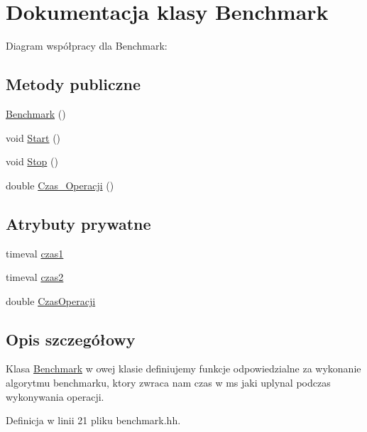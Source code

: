 \hypertarget{class_benchmark}{\section{\-Dokumentacja klasy \-Benchmark}
\label{class_benchmark}
}


\-Diagram współpracy dla \-Benchmark\-:
\subsection*{\-Metody publiczne}
\begin{DoxyCompactItemize}
\item 
\hyperlink{class_benchmark_acfca497989836a688d44477802e822d8}{\-Benchmark} ()
\item 
void \hyperlink{class_benchmark_ac55ca7809108ed22a644d6d41071d187}{\-Start} ()
\item 
void \hyperlink{class_benchmark_aa3ca94f8984beb0ecbfa77d50cbe5c3a}{\-Stop} ()
\item 
double \hyperlink{class_benchmark_aee4890492aa777816da1d63fa7a8c4c2}{\-Czas\-\_\-\-Operacji} ()
\end{DoxyCompactItemize}
\subsection*{\-Atrybuty prywatne}
\begin{DoxyCompactItemize}
\item 
timeval \hyperlink{class_benchmark_a461847eb9a01e511e19af6cd7bcc057e}{czas1}
\item 
timeval \hyperlink{class_benchmark_a56ec92a30b650825403d14907a321eea}{czas2}
\item 
double \hyperlink{class_benchmark_accd4af9649210ce216db513c0676c401}{\-Czas\-Operacji}
\end{DoxyCompactItemize}


\subsection{\-Opis szczegółowy}
\-Klasa \hyperlink{class_benchmark}{\-Benchmark} w owej klasie definiujemy funkcje odpowiedzialne za wykonanie algorytmu benchmarku, ktory zwraca nam czas w ms jaki uplynal podczas wykonywania operacji. 

\-Definicja w linii 21 pliku benchmark.\-hh.



